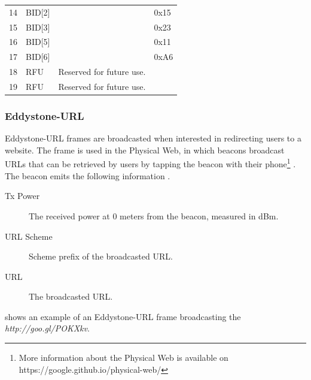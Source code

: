\begin{table}[h!]
\begin{tabular}{llll}
14                   & BID{[}2{]}     &                                       & 0x15           \\
15                   & BID{[}3{]}     &                                       & 0x23           \\
16                   & BID{[}5{]}     &                                       & 0x11           \\
17                   & BID{[}6{]}     &                                       & 0xA6           \\
18                   & RFU            & Reserved for future use.               &                \\
19                   & RFU            & Reserved for future use.               &               
\end{tabular}
\end{table}

\subsubsection{Eddystone-URL}

Eddystone-URL frames are broadcasted when interested in redirecting users to a website. The frame is used in the Physical Web, in which beacons broadcast URLs that can be retrieved by users by tapping the beacon with their phone\footnote{More information about the Physical Web is available on https://google.github.io/physical-web/} \cite{eddystone:protocol-url-spec}. The beacon emits the following information \cite{eddystone:protocol-url-spec}.

\begin{description}
\item[Tx Power] The received power at 0 meters from the beacon, measured in dBm.
\item[URL Scheme] Scheme prefix of the broadcasted URL.
\item[URL] The broadcasted URL.
\end{description}

 shows an example of an Eddystone-URL frame broadcasting the \emph{http://goo.gl/POKXkv}.

